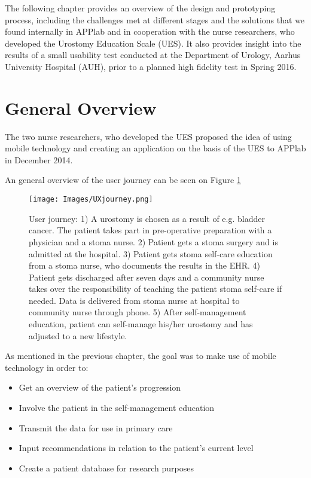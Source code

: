 The following chapter provides an overview of the design and prototyping process, including the challenges met at different stages and the solutions that we found internally in APPlab and in cooperation with the nurse researchers, who developed the Urostomy Education Scale (UES). It also provides insight into the results of a small usability test conducted at the Department of Urology, Aarhus University Hospital (AUH), prior to a planned high fidelity test in Spring 2016. 

\section{General Overview}
The two nurse researchers, who developed the UES proposed the idea of using mobile technology and creating an application on the basis of the UES to APPlab in December 2014. 

An general overview of the user journey can be seen on Figure \ref{fig:journey}


\begin{figure}[!h] \centering
			\texttt{[image: Images/UXjourney.png]}
		\caption{User journey: 1) A urostomy is chosen as a result of e.g. bladder cancer. The patient takes part in pre-operative preparation with a physician and a stoma nurse. 2) Patient gets a stoma surgery and is admitted at the hospital. 3) Patient gets stoma self-care education from a stoma nurse, who documents the results in the EHR. 4) Patient gets discharged after seven days and a community nurse takes over the responsibility of teaching the patient stoma self-care if needed. Data is delivered from stoma nurse at hospital to community nurse through phone. 5) After self-management education, patient can self-manage his/her urostomy and has adjusted to a new lifestyle.} \label{fig:journey}
\end{figure}



As mentioned in the previous chapter, the goal was to make use of  mobile technology in order to: 

\begin{itemize}
\item Get an overview of the patient's progression
\item Involve the patient in the self-management education
\item Transmit the data for use in primary care
\item Input recommendations in relation to the patient's current level
\item Create a patient database for research purposes 
\end{itemize}

